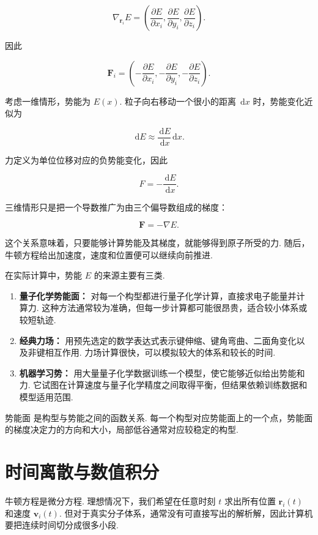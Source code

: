 \documentclass[UTF8,11pt,a4paper,openany]{ctexbook}
\newcommand{\dd}{\,\mathrm d}\newcommand{\Ham}{\hat H}\newcommand{\tr}{\operatorname{Tr}}
\begin{document}
\[
\nabla_{\mathbf r_i}E
=
\left(
\frac{\partial E}{\partial x_i},
\frac{\partial E}{\partial y_i},
\frac{\partial E}{\partial z_i}
\right).
\]

因此

\[
\mathbf F_i
=
\left(
-\frac{\partial E}{\partial x_i},
-\frac{\partial E}{\partial y_i},
-\frac{\partial E}{\partial z_i}
\right).
\]

\begin{derivationbox}
考虑一维情形，势能为 $E(x)$. 粒子向右移动一个很小的距离 $\dd x$ 时，势能变化近似为

\[
\dd E\approx \frac{\dd E}{\dd x}\dd x.
\]

力定义为单位位移对应的负势能变化，因此

\[
F=-\frac{\dd E}{\dd x}.
\]

三维情形只是把一个导数推广为由三个偏导数组成的梯度：

\[
\mathbf F=-\nabla E.
\]
\end{derivationbox}

这个关系意味着，只要能够计算势能及其梯度，就能够得到原子所受的力. 随后，牛顿方程给出加速度，速度和位置便可以继续向前推进. 

在实际计算中，势能 $E$ 的来源主要有三类. 

\begin{enumerate}
\item \textbf{量子化学势能面：} 对每一个构型都进行量子化学计算，直接求电子能量并计算力. 这种方法通常较为准确，但每一步计算都可能很昂贵，适合较小体系或较短轨迹. 
\item \textbf{经典力场：} 用预先选定的数学表达式表示键伸缩、键角弯曲、二面角变化以及非键相互作用. 力场计算很快，可以模拟较大的体系和较长的时间. 
\item \textbf{机器学习势：} 用大量量子化学数据训练一个模型，使它能够近似给出势能和力. 它试图在计算速度与量子化学精度之间取得平衡，但结果依赖训练数据和模型适用范围. 
\end{enumerate}

\begin{definitionbox}
势能面 是构型与势能之间的函数关系. 每一个构型对应势能面上的一个点，势能面的梯度决定力的方向和大小，局部低谷通常对应较稳定的构型. 
\end{definitionbox}

\section{时间离散与数值积分}

牛顿方程是微分方程. 理想情况下，我们希望在任意时刻 $t$ 求出所有位置 $\mathbf r_i(t)$ 和速度 $\mathbf v_i(t)$. 但对于真实分子体系，通常没有可直接写出的解析解，因此计算机要把连续时间切分成很多小段. 
\end{document}

